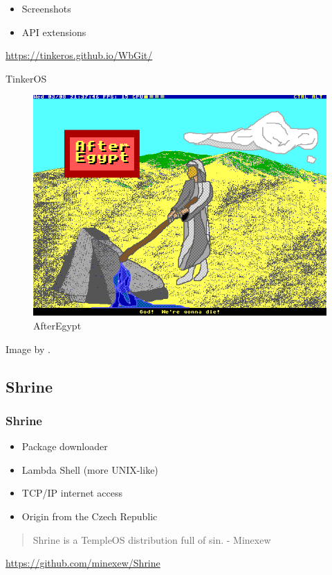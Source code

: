 \documentclass{beamer}
\begin{document}
{\begin{frame}
\begin{itemize}
			\item Screenshots

			\item API extensions
		\end{itemize}
		\url{https://tinkeros.github.io/WbGit/}
	\end{frame}

	\begin{frame}{TinkerOS}
		\begin{figure}[h]
			\centering
			\includegraphics[width=0.6\linewidth]{images/after_egypt.png}
			\caption{AfterEgypt}
			\label{fig:AfterEgypt}
		\end{figure}
		Image by \cite{tinkeros_tinkeros_2024}.
	\end{frame}

	\subsection{Shrine}
	\begin{frame}
		\frametitle{Shrine}
		\begin{itemize}
			\item Package downloader

			\item Lambda Shell (more UNIX-like)

			\item TCP/IP internet access

			\item Origin from the Czech Republic
		\end{itemize}

		\vspace{1em}
		\begin{quote}
			Shrine is a TempleOS distribution full of sin. \flushright - Minexew
		\end{quote}
		\url{https://github.com/minexew/Shrine}
	\end{frame}

}
\end{document}

